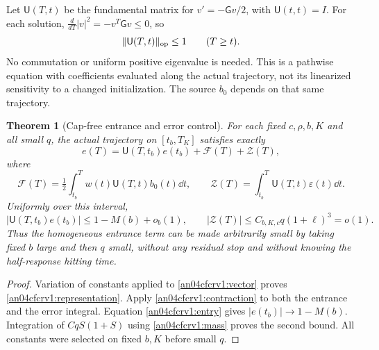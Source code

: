 \documentclass[11pt]{article}
\newtheorem{theorem}{Theorem}\newtheorem{lemma}{Lemma}
\begin{document}
Let $\mathsf U(T,t)$ be the fundamental matrix for
$v'=-\mathsf Gv/2$, with $\mathsf U(t,t)=I$.
For each solution,
$\frac{d}{dT}|v|^2=-v^T\mathsf Gv\le0$, so
\begin{equation}\label{an04cfcrv1:contraction}
 \|\mathsf U(T,t)\|_{\rm op}\le1\qquad(T\ge t).
\end{equation}
No commutation or uniform positive eigenvalue is needed.
This is a pathwise equation with coefficients evaluated along
the actual trajectory, not its linearized sensitivity to a changed
initialization. The source $b_0$ depends on that same trajectory.

\begin{theorem}[Cap-free entrance and error control]
\label{an04cfcrv1:main}
For each fixed $c,\rho,b,K$ and all small $q$, the actual trajectory
on $[t_b,T_K]$ satisfies exactly
\begin{equation}\label{an04cfcrv1:representation}
 e(T)=\mathsf U(T,t_b)e(t_b)+\mathcal F(T)+\mathcal Z(T),
\end{equation}
where
\[
 \mathcal F(T)=\tfrac12\int_{t_b}^T
          w(t)\mathsf U(T,t)b_0(t)\dd t,\qquad
 \mathcal Z(T)=\int_{t_b}^T\mathsf U(T,t)\varepsilon(t)\dd t.
\]
Uniformly over this interval,
\begin{equation}\label{an04cfcrv1:paid}
 |\mathsf U(T,t_b)e(t_b)|\le1-M(b)+o_b(1),\qquad
 |\mathcal Z(T)|\le C_{b,K,c}q(1+\ell)^3=o(1).
\end{equation}
Thus the homogeneous entrance term can be made arbitrarily small
by taking fixed $b$ large and then $q$ small, without any residual
stop and without knowing the half-response hitting time.
\end{theorem}
\begin{proof}
Variation of constants applied to \eqref{an04cfcrv1:vector} proves
\eqref{an04cfcrv1:representation}. Apply
\eqref{an04cfcrv1:contraction} to both the entrance and the error
integral. Equation \eqref{an04cfcrv1:entry} gives
$|e(t_b)|\to1-M(b)$. Integration of
$CqS(1+S)$ using \eqref{an04cfcrv1:mass} proves the second bound.
All constants were selected on fixed $b,K$ before small $q$.
\end{proof}
\end{document}
